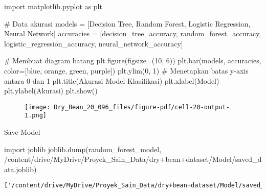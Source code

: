 \documentclass[
  letterpaper,
]{krantz}
\makeatletter
\newenvironment{Shaded}{\begin{snugshade}}{\end{snugshade}}
\newcommand{\CommentTok}[1]{\textcolor[rgb]{0.37,0.37,0.37}{#1}}
\newcommand{\DecValTok}[1]{\textcolor[rgb]{0.68,0.00,0.00}{#1}}
\newcommand{\ImportTok}[1]{\textcolor[rgb]{0.00,0.46,0.62}{#1}}
\newcommand{\NormalTok}[1]{\textcolor[rgb]{0.00,0.23,0.31}{#1}}
\newcommand{\OperatorTok}[1]{\textcolor[rgb]{0.37,0.37,0.37}{#1}}
\newcommand{\StringTok}[1]{\textcolor[rgb]{0.13,0.47,0.30}{#1}}
\newenvironment{kframe}{%
\medskip{}
\setlength{\fboxsep}{.8em}
 \def\at@end@of@kframe{}%
 \ifinner\ifhmode%
  \def\at@end@of@kframe{\end{minipage}}%
  \begin{minipage}{\columnwidth}%
 \fi\fi%
 \def\FrameCommand##1{\hskip\@totalleftmargin \hskip-\fboxsep
 \colorbox{shadecolor}{##1}\hskip-\fboxsep
     \hskip-\linewidth \hskip-\@totalleftmargin \hskip\columnwidth}%
 \MakeFramed {\advance\hsize-\width
   \@totalleftmargin\z@ \linewidth\hsize
   \@setminipage}}%
 {\par\unskip\endMakeFramed%
 \at@end@of@kframe}
\renewenvironment{Shaded}{\begin{kframe}}{\end{kframe}}
\makeatother
\begin{document}
\begin{Shaded}
\begin{Highlighting}[]
\ImportTok{import}\NormalTok{ matplotlib.pyplot }\ImportTok{as}\NormalTok{ plt}

\CommentTok{\# Data akurasi}
\NormalTok{models }\OperatorTok{=}\NormalTok{ [}\StringTok{\textquotesingle{}Decision Tree\textquotesingle{}}\NormalTok{, }\StringTok{\textquotesingle{}Random Forest\textquotesingle{}}\NormalTok{, }\StringTok{\textquotesingle{}Logistic Regression\textquotesingle{}}\NormalTok{, }\StringTok{\textquotesingle{}Neural Network\textquotesingle{}}\NormalTok{]}
\NormalTok{accuracies }\OperatorTok{=}\NormalTok{ [decision\_tree\_accuracy, random\_forest\_accuracy, logistic\_regression\_accuracy, neural\_network\_accuracy]}

\CommentTok{\# Membuat diagram batang}
\NormalTok{plt.figure(figsize}\OperatorTok{=}\NormalTok{(}\DecValTok{10}\NormalTok{, }\DecValTok{6}\NormalTok{))}
\NormalTok{plt.bar(models, accuracies, color}\OperatorTok{=}\NormalTok{[}\StringTok{\textquotesingle{}blue\textquotesingle{}}\NormalTok{, }\StringTok{\textquotesingle{}orange\textquotesingle{}}\NormalTok{, }\StringTok{\textquotesingle{}green\textquotesingle{}}\NormalTok{, }\StringTok{\textquotesingle{}purple\textquotesingle{}}\NormalTok{])}
\NormalTok{plt.ylim(}\DecValTok{0}\NormalTok{, }\DecValTok{1}\NormalTok{)  }\CommentTok{\# Menetapkan batas y{-}axis antara 0 dan 1}
\NormalTok{plt.title(}\StringTok{\textquotesingle{}Akurasi Model Klasifikasi\textquotesingle{}}\NormalTok{)}
\NormalTok{plt.xlabel(}\StringTok{\textquotesingle{}Model\textquotesingle{}}\NormalTok{)}
\NormalTok{plt.ylabel(}\StringTok{\textquotesingle{}Akurasi\textquotesingle{}}\NormalTok{)}
\NormalTok{plt.show()}
\end{Highlighting}
\end{Shaded}

\begin{figure}[H]

{\centering \texttt{[image: Dry\_Bean\_20\_096\_files/figure-pdf/cell-20-output-1.png]}

}

\end{figure}

Save Model

\begin{Shaded}
\begin{Highlighting}[]
\ImportTok{import}\NormalTok{ joblib}
\NormalTok{joblib.dump(random\_forest\_model, }\StringTok{\textquotesingle{}/content/drive/MyDrive/Proyek\_Sain\_Data/dry+bean+dataset/Model/saved\_data.joblib\textquotesingle{}}\NormalTok{)}
\end{Highlighting}
\end{Shaded}

\begin{verbatim}
['/content/drive/MyDrive/Proyek_Sain_Data/dry+bean+dataset/Model/saved_data.joblib']
\end{verbatim}



\backmatter
\printindex
\end{document}

